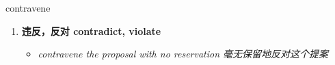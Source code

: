 
\begin{frame}
{\huge contravene}
\begin{center}
\begin{enumerate}\Large
  \item \textbf{违反，反对 contradict, violate}
  \begin{itemize}
    \item \em{\Large{contravene the proposal with no reservation 毫无保留地反对这个提案}}
  \end{itemize}
\end{enumerate}
\end{center}
\end{frame}
